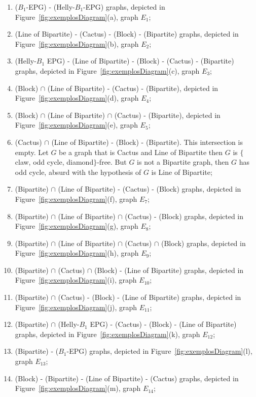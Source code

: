 \documentclass{dmgt}
\begin{document}
\begin{enumerate}[label=(\arabic*)]
    \item ($B_1$-EPG)  - (Helly-$B_1$-EPG) graphs, depicted in Figure~\ref{fig:exemplosDiagram}(a), graph $E_1$;%
    
    \item (Line of Bipartite)  - (Cactus) - (Block) - (Bipartite) graphs, depicted in Figure~\ref{fig:exemplosDiagram}(b), graph $E_2$;%
    \item (Helly-$B_1$ EPG) - (Line of Bipartite) - (Block) - (Cactus) - (Bipartite) graphs, depicted in Figure~\ref{fig:exemplosDiagram}(c), graph $E_3$;%
    \item (Block) $\cap$ (Line of Bipartite) - (Cactus) - (Bipartite), depicted in Figure~\ref{fig:exemplosDiagram}(d), graph $E_4$;%
    \item (Block) $\cap$ (Line of Bipartite) $\cap$  (Cactus) - (Bipartite), depicted in Figure~\ref{fig:exemplosDiagram}(e), graph $E_5$;%
    \item (Cactus) $\cap$ (Line of Bipartite) - (Block) - (Bipartite). This intersection is empty. Let $G$ be a graph that is Cactus and Line of Bipartite then $G$ is $\{$claw, odd cycle, diamond$\}$-free. But $G$ is not a Bipartite graph, then $G$ has odd cycle, %
     absurd with the hypothesis of $G$ is Line of Bipartite;%
    \item (Bipartite) $\cap$ (Line of Bipartite)  - (Cactus) - (Block) graphs, depicted in Figure~\ref{fig:exemplosDiagram}(f), graph $E_7$;%
    \item (Bipartite) $\cap$ (Line of Bipartite) $\cap$  (Cactus) - (Block) graphs, depicted in Figure~\ref{fig:exemplosDiagram}(g), graph $E_8$;%
    \item (Bipartite) $\cap$ (Line of Bipartite) $\cap$  (Cactus) $\cap$ (Block) graphs, depicted in Figure~\ref{fig:exemplosDiagram}(h), graph $E_9$;%
  \item (Bipartite) $\cap$  (Cactus) $\cap$ (Block) - (Line of Bipartite) graphs, depicted in Figure~\ref{fig:exemplosDiagram}(i), graph $E_{10}$;%
    \item (Bipartite)  $\cap$  (Cactus) - (Block) -  (Line of Bipartite) graphs, depicted in Figure~\ref{fig:exemplosDiagram}(j), graph $E_{11}$;%
     \item (Bipartite) $\cap$ (Helly-$B_1$ EPG) - (Cactus) - (Block) -  (Line of Bipartite) graphs, depicted in Figure~\ref{fig:exemplosDiagram}(k), graph $E_{12}$;%
      \item (Bipartite) - ($B_1$-EPG) graphs, depicted in Figure~\ref{fig:exemplosDiagram}(l), graph $E_{13}$;%
      \item (Block) - (Bipartite) - (Line of Bipartite)  - (Cactus) graphs, depicted in Figure~\ref{fig:exemplosDiagram}(m), graph $E_{14}$;%
 

\end{enumerate}
\end{document}
